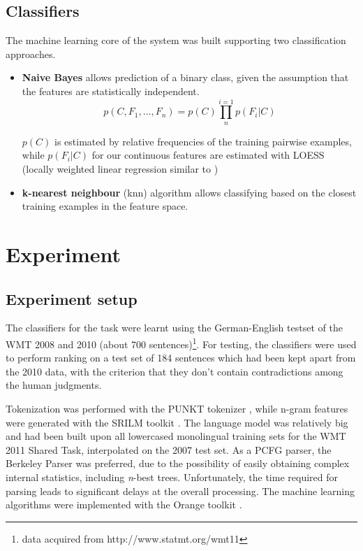\documentclass[11pt]{article}
\begin{document}
\subsection{Classifiers}
The machine learning core of the system was built supporting two
classification approaches. 
\begin{itemize}
  \item \textbf{Naive Bayes} allows prediction of a binary class, given the
  assumption that the features are statistically independent. 
  \[
  p(C, F_1, \ldots, F_n) = p(C)\prod_{n}^{i=1}p(F_i|C)
  \]
  
  \(p(C)\) is estimated by relative frequencies of the training pairwise
  examples, while \(p(F_i|C)\) for our continuous features are
  estimated with LOESS (locally weighted linear regression similar to
  \cite{cleveland1979robust})
  \item \textbf{k-nearest neighbour} (knn) algorithm allows classifying based
  on the closest training examples in the feature space. 
\end{itemize}





\section{Experiment}
\subsection{Experiment setup}
The classifiers for the task were learnt using the German-English testset
 of the \textsc{WMT} 2008 and 2010 (about 700
 sentences)\footnote{data acquired from http://www.statmt.org/wmt11}. For
 testing, the classifiers were used to perform ranking on a test set of 184
 sentences which had been kept apart from the 2010 data, with the criterion that
 they don't contain contradictions among the human judgments.
 
 Tokenization was performed with the \textsc{PUNKT} tokenizer
 \cite{Kiss_2006unsupervised,Garrette_anextensible}, while n-gram features were
 generated with the \textsc{SRILM} toolkit \cite{Stolcke02srilm}.
 The language model was relatively big and had been built upon all lowercased
 monolingual training sets for the WMT 2011 Shared Task, interpolated on the
 2007 test set. As a PCFG parser, the Berkeley Parser
 \cite{Petrov07improvedinference} was preferred, due to the possibility of
 easily obtaining complex internal statistics, including \textit{n}-best trees.
 Unfortunately, the time required for parsing leads to significant delays at
 the overall processing. The machine learning algorithms were implemented with the Orange
 toolkit \cite{demsar2004orange}.
\end{document}
